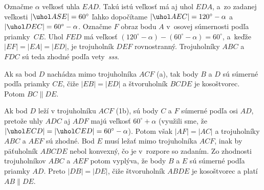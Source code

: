 {%
Označme $\alpha$ veľkosť uhla $EAD$. Takú istú veľkosť má aj uhol $EDA$, a~zo zadanej veľkosti $|\uhol ASE|=60^\circ$ ľahko dopočítame $|\uhol AEC| = 120^\circ-\alpha$ a~$|\uhol DEC| = 60^\circ -\alpha$. Označme $F$ obraz bodu $A$ v~osovej súmernosti podľa priamky~$CE$. Uhol $FED$ má veľkosť $(120^\circ-\alpha)-(60^\circ -\alpha)=60^\circ$, a~keďže $|EF| = |EA| = |ED|$,
je trojuholník $DEF$ rovnostranný. Trojuholníky $ABC$ a~$FDC$ sú teda zhodné podľa vety~{\it sss}.
%

Ak sa bod $D$ nachádza mimo trojuholníka $ACF$ (\obr{}a), tak body $B$ a $D$ sú súmerné podľa priamky $CE$,
čiže $|EB| = |ED|$ a štvoruholník $BCDE$ je kosoštvorec. Potom $BC\parallel DE$.

Ak bod $D$ leží v trojuholníku $ACF$ (\obrr1b), sú body $C$ a $F$ súmerné podľa osi $AD$, pretože uhly $ADC$ aj $ADF$ majú veľkosť $60^\circ+\alpha$
(využili sme, že $|\uhol ECD| = |\uhol CED| = 60^\circ-\alpha$). Potom však $|AF| = |AC|$ a trojuholníky $ABC$ a $AEF$ sú zhodné.
Bod $E$ musí ležať mimo trojuholníka $ACF$, inak by päťuholník $ABCDE$ nebol konvexný, čo je v~rozpore so zadaním.
Zo zhodnosti trojuholníkov $ABC$ a $AEF$ potom vyplýva, že body $B$ a $E$ sú súmerné podľa priamky $AD$. Preto $|DB| = |DE|$,
čiže štvoruholník $ABDE$ je kosoštvorec a platí $AB\parallel DE$.
}

